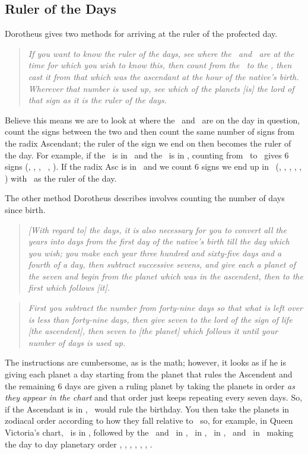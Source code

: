 \subsection{Ruler of the Days}
Dorotheus gives two methods for arriving at the ruler of the profected day.
\begin{quote}
\textsl{
If you want to know the ruler of the days, see where the \Sun\, and \Moon\, are at the time for which you wish to know this, then count from the \Sun\, to the \Moon, then cast it from that which was the ascendant at the hour of the native's birth. Wherever that number is used up, see which of the planets [is] the lord of that sign as it is the ruler of the days.}
\end{quote}

Believe this means we are to look at where the \Sun\, and \Moon\, are on the day in question, count the signs between the two and then count the same number of signs from the radix Ascendant; the ruler of the sign we end on then becomes the ruler of the day. For example, if the \Sun\, is in \Aquarius\, and the \Moon\, is in \Cancer, counting from \Aquarius\, to \Cancer\, gives 6 signs (\Aquarius, \Pisces, \Aries, \Taurus\, \Gemini, \Cancer). If the radix Asc is in \Gemini\, and we count 6 signs we end up in \Sagittarius\,  (\Gemini, \Cancer, \Leo, \Virgo, \Libra, \Sagittarius) with \Jupiter\, as the ruler of the day.

The other method Dorotheus describes involves counting the number of days since birth.
\begin{quote}
\textsl{[With regard to] the days, it is also necessary for you to convert all the years into days from the first day of the native's birth till the day which you wish; you make each year three hundred and sixty-five days and a fourth of a day, then subtract successive sevens, and give each a planet of the seven and begin from the planet which was in the ascendent, then to the first which follows [it].
}
\end{quote}
\begin{quote}
\textsl{First you subtract the number from forty-nine days so that what is left over is less than forty-nine days, then give seven to the lord of the sign of life [the ascendent], then seven to [the planet] which follows it until your number of days is used up.
}
\end{quote}

The instructions are cumbersome, as is the math; however, it looks as if he is giving each planet a day starting from the planet that rules the Ascendent and the remaining 6 days are given a ruling planet by taking the planets in order \textsl{as they appear in the chart} and that order just keeps repeating every seven days. So, if the Ascendant is in \Gemini, \Mercury\, would rule the birthday. You then take the planets in zodiacal order according to how they fall relative to \Mercury\, so, for example, in Queen Victoria's chart, \Mercury\, is in \Taurus, followed by the \Sun\, and \Moon\, in \Gemini, \Jupiter\, in \Aquarius, \Saturn\, in \Pisces, \Mars\, and \Venus\, in \Aries\, making the day to day planetary order \Mercury, \Sun, \Moon, \Jupiter, \Saturn, \Mars, \Venus.

